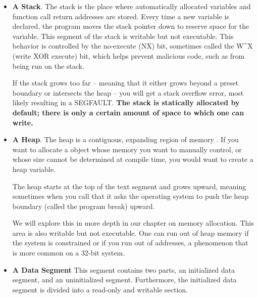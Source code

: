 \begin{itemize}
\item \textbf{A Stack}.
The stack is the place where automatically allocated variables and function call return addresses are stored.
Every time a new variable is declared, the program moves the stack pointer down to reserve space for the variable.
This segment of the stack is writable but not executable.
This behavior is controlled by the no-execute (NX) bit, sometimes called the W^X (write XOR execute) bit, which helps prevent malicious code, such as  from being run on the stack.

If the stack grows too far -- meaning that it either grows beyond a preset boundary or intersects the heap -- you will get a stack overflow error, most likely resulting in a SEGFAULT.
\textbf{The stack is statically allocated by default; there is only a certain amount of space to which one can write.}

\item \textbf{A Heap}.
The heap is a contiguous, expanding region of memory \cite{mallocinternals}.
If you want to allocate a object whose memory you want to manually control, or whose size cannot be determined at compile time, you would want to create a heap variable.

The heap starts at the top of the text segment and grows upward, meaning sometimes when you call  that it asks the operating system to push the heap boundary (called the program break) upward.

We will explore this in more depth in our chapter on memory allocation.
This area is also writable but not executable.
One can run out of heap memory if the system is constrained or if you run out of addresses, a phenomenon that is more common on a 32-bit system.

\item \textbf{A Data Segment}
This segment contains two parts, an initialized data segment, and an uninitialized segment. Furthermore, the initialized data segment is divided into a read-only and writable section.

\end{itemize}

